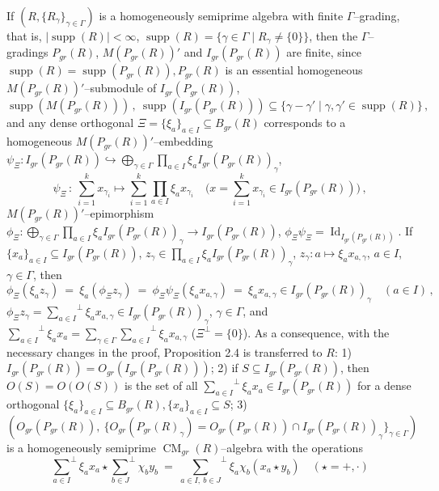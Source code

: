 \documentclass[a4paper,11pt]{article}
\DeclareMathOperator{\supp}{supp}
\DeclareMathOperator{\Id}{Id}
\DeclareMathOperator{\CM}{CM}
\begin{document}
If ${(R, \{R_{\gamma}\}_{\gamma\in \Gamma})}$ is a homogeneously semiprime 
algebra with finite $\Gamma$--grading, that is, ${|\supp(R)|< \infty}$, 
${\supp(R)=\{\gamma\in \Gamma\mid R_{\gamma}\ne \{0\}\}}$, then the 
$\Gamma$--gradings $P_{gr}(R)$, $M(P_{gr}(R))'$ and $I_{gr}(P_{gr}(R))$ 
are finite, since ${\supp(R)=\supp(P_{gr}(R)), P_{gr}(R)}$ is an 
essential homogeneous $M(P_{gr}(R))'$--submodule of $I_{gr}(P_{gr}(R))$, 
\[
\supp(M(P_{gr}(R)))\,,\ \supp(I_{gr}(P_{gr}(R))) \subseteq 
\{\gamma-\gamma'\mid \gamma, \gamma'\in \supp(R)\}\,,
\]
and any dense orthogonal $\Xi=\{\xi_a\}_{a\in I}\subseteq B_{gr}(R)$ 
corresponds to a homogeneous $M(P_{gr}(R))'$--embedding 
${\psi_{\Xi}: I_{gr}(P_{gr}(R))\hookrightarrow 
\bigoplus\limits_{\gamma\in \Gamma} 
\prod\limits_{a\in I} \xi_a I_{gr}(P_{gr}(R))_{\gamma}}$, 
\[
\psi_{\Xi}\,:\ \sum_{i=1}^k x_{\gamma_i}\longmapsto 
\sum_{i=1}^k \prod_{a\in I} \xi_a x_{\gamma_i}\quad 
\biggl(x=\sum_{i=1}^k x_{\gamma_i}\in I_{gr}(P_{gr}(R))\biggr)\,,
\]
$M(P_{gr}(R))'$--epimorphism 
${\phi_{\Xi}: \bigoplus\limits_{\gamma\in \Gamma} 
\prod\limits_{a\in I} \xi_a I_{gr}(P_{gr}(R))_{\gamma}\longrightarrow 
I_{gr}(P_{gr}(R))}$, ${\phi_{\Xi} \psi_{\Xi}=\Id_{I_{gr}(P_{gr}(R))}}$. 
If ${\{x_a\}_{a\in I}\subseteq I_{gr}(P_{gr}(R))}$, 
${z_{\gamma}\in \prod\limits_{a\in I} \xi_a I_{gr}(P_{gr}(R))_{\gamma}}$, 
${z_{\gamma}: a\longmapsto \xi_a x_{a, \gamma}}$, ${a\in I}$, 
${\gamma\in \Gamma}$, then  
\[
\phi_{\Xi} (\xi_a z_{\gamma})\ =\ \xi_a (\phi_{\Xi} z_{\gamma})\ =\ 
\phi_{\Xi} \psi_{\Xi}(\xi_a x_{a, \gamma})\ =\ \xi_a x_{a, \gamma}\in 
I_{gr}(P_{gr}(R))_{\gamma}\quad (a\in I)\,,
\]
${\phi_{\Xi} z_{\gamma}={\sum\limits_{a\in I}}^{\perp} \xi_a x_{a,\gamma}\in 
I_{gr}(P_{gr}(R))_{\gamma}}$, ${\gamma\in \Gamma}$, and 
${{\sum\limits_{a\in I}}^{\perp} \xi_a x_a=
\sum\limits_{\gamma\in \Gamma} 
{\sum\limits_{a\in I}}^{\perp} \xi_a x_{a, \gamma}}$ (${\Xi^{\perp}=\{0\}}$). 
As a consequence, with the necessary changes in the proof, Proposition 2.4 is 
transferred to $R$: 1) ${I_{gr}(P_{gr}(R))=O_{gr}(I_{gr}(P_{gr}(R)))}$; 2) 
if ${S\subseteq I_{gr}(P_{gr}(R))}$, then ${O(S)=O(O(S))}$ is the set of 
all ${{\sum\limits_{a\in I}}^{\perp} \xi_a x_a\in I_{gr}(P_{gr}(R))}$ for a 
dense orthogonal 
${\{\xi_a\}_{a\in I}\subseteq B_{gr}(R), \{x_a\}_{a\in I}\subseteq S}$; 3) 
\[
(O_{gr}(P_{gr}(R)),\ \{O_{gr}(P_{gr}(R)_{\gamma})=O_{gr}(P_{gr}(R))\cap 
I_{gr}(P_{gr}(R))_{\gamma}\}_{\gamma\in \Gamma})
\]
is a homogeneously semiprime $\CM_{gr}(R)$--algebra with the operations 
\[
{\sum\limits_{a\in I}}^{\perp} \xi_a x_a\star 
{\sum\limits_{b\in J}}^{\perp} \chi_b y_b\ =\ 
{\sum\limits_{a\in I,\ b\in J}}^{\perp} \xi_a \chi_b (x_a\star y_b)\quad 
(\star=+, \cdot) 
\]
\end{document}
